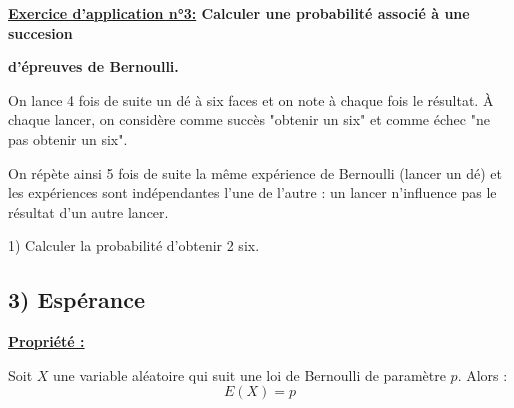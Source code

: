\documentclass[12pt]{article}
\begin{document}
\newpage
\begin{mdframed}[
    linewidth=1pt,
    roundcorner=5pt,
    linecolor=RoyalBlue,
    innertopmargin=10pt,
    innerbottommargin=10pt
]
{\color{RoyalBlue}
\textbf{\underline{Exercice d'application n°3:} Calculer une probabilité associé à une succesion}

\textbf{d'épreuves 
de Bernoulli.}}

\vspace{5pt}
On lance 4 fois de suite un dé à six faces et on note à chaque fois le résultat.
À chaque lancer, on considère comme succès "obtenir un six" et comme échec "ne pas
obtenir un six".

On répète ainsi 5 fois de suite la même expérience de Bernoulli (lancer un dé) et les
expériences sont indépendantes l'une de l'autre : un lancer n'influence pas le résultat d'un
autre lancer.

\vspace{10pt}
\hspace{1cm}1) Calculer la probabilité d'obtenir 2 six.

\vspace{0.5cm}
{\color{black!45}\dotfill}

\vspace{0.5cm}
{\color{black!45}\dotfill}

\vspace{0.5cm}
{\color{black!45}\dotfill}

\vspace{0.5cm}
{\color{black!45}\dotfill}

\vspace{0.5cm}
{\color{black!45}\dotfill}

\vspace{0.5cm}
{\color{black!45}\dotfill}

\vspace{0.5cm}
{\color{black!45}\dotfill}

\vspace{0.5cm}
{\color{black!45}\dotfill}

\vspace{0.5cm}
{\color{black!45}\dotfill}

\vspace{20pt}

\end{mdframed}

\vspace{5pt}
\subsection*{\hspace{1cm} 3) Espérance }

\begin{mdframed}[
    linewidth=1pt,
    roundcorner=5pt,
    linecolor=Red,
    innertopmargin=10pt,
    innerbottommargin=-5pt
]
{\color{red}
\textbf{\underline{Propriété :}}

\vspace{5pt}
Soit $X$ une variable aléatoire qui suit une loi de Bernoulli de paramètre $p$. Alors : 
\[
E(X) = p
\]
}
\end{mdframed}
\end{document}
